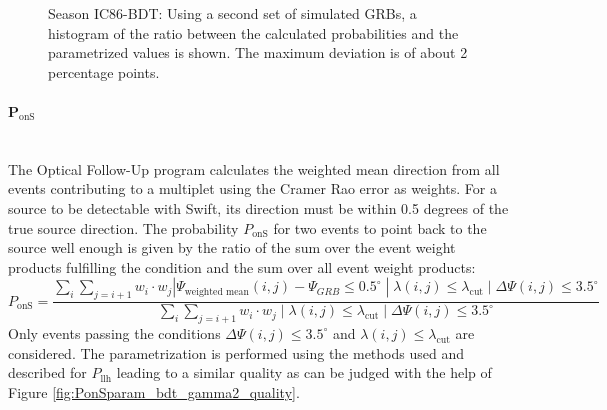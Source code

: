 \begin{figure}[h]
\centering
 \captionsetup{width=.85\textwidth}
\caption{Season IC86-BDT: Using a second set of simulated GRBs, a histogram 
of the ratio between the calculated probabilities and the parametrized values 
is shown. The maximum deviation 
is of about 2 percentage points.}
\end{figure}


\paragraph{P$_\text{onS}$}$\;$\\
The Optical Follow-Up program calculates the weighted mean direction from all
events contributing to a multiplet using the Cramer Rao error as weights. For a 
source to be detectable
with Swift, its
direction must be within 0.5 degrees of the true source direction. The
probability $P_\text{onS}$ for two events to point back to the source well
enough is given by
the ratio of the sum over the event weight products fulfilling the condition
and the sum over all event weight products:
\begin{equation}
P_\text{onS} = \frac{\sum_i \sum_{j=i+1} w_i \cdot w_j |
\Psi_{\text{weighted mean}}(i, j) - \Psi_{GRB} \leq 0.5^{\circ} \; | \;
\lambda(i, j)
\leq \lambda_\text{cut} \; | \; \Delta \Psi(i, j) \leq 3.5^{\circ}}{\sum_i
\sum_{j=i+1} w_i \cdot w_j \; | \; \lambda(i, j)
\leq \lambda_\text{cut} \; | \; \Delta \Psi(i, j) \leq 3.5^{\circ}} 
\end{equation}
Only events passing the conditions $\Delta \Psi(i,j) \leq 3.5^\circ$ and 
$\lambda(i, j) \leq \lambda_\text{cut}$ are considered.
The parametrization is performed using the methods used and described for 
$P_\text{llh}$ leading to a similar quality as can be judged with the help of 
Figure 
\ref{fig:PonSparam_bdt_gamma2_quality}.

